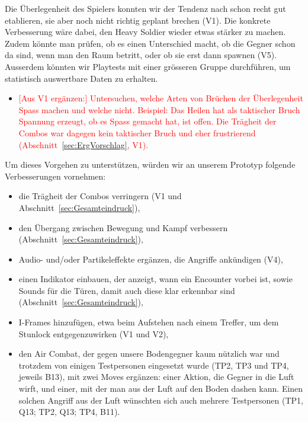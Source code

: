 \documentclass[../Main.tex]{subfiles}
\begin{document}
Die Überlegenheit des Spielers konnten wir der Tendenz nach schon recht gut etablieren, sie aber noch nicht richtig geplant brechen (V1). Die konkrete Verbesserung wäre dabei, den Heavy Soldier wieder etwas stärker zu machen. Zudem könnte man prüfen, ob es einen Unterschied macht, ob die Gegner schon da sind, wenn man den Raum betritt, oder ob sie erst dann spawnen (V5). Ausserdem könnten wir Playtests mit einer grösseren Gruppe durchführen, um statistisch auswertbare Daten zu erhalten.

\begin{itemize}[leftmargin=1.5cm]
    \item \textcolor{red}{[Aus V1 ergänzen:] Untersuchen, welche Arten von Brüchen der Überlegenheit Spass machen und welche nicht. Beispiel: Das Heilen hat als taktischer Bruch Spannung erzeugt, ob es Spass gemacht hat, ist offen. Die Trägheit der Combos war dagegen kein taktischer Bruch und eher frustrierend (Abschnitt~\ref{sec:ErgVorschlag}, V1).}
\end{itemize}

Um dieses Vorgehen zu unterstützen, würden wir an unserem Prototyp folgende Verbesserungen vornehmen:

\begin{itemize}[leftmargin=1.5cm]
    \item die Trägheit der Combos verringern (V1 und Abschnitt~\ref{sec:Gesamteindruck}),
    \item den Übergang zwischen Bewegung und Kampf verbessern (Abschnitt~\ref{sec:Gesamteindruck}),
    \item Audio- und/oder Partikeleffekte ergänzen, die Angriffe ankündigen (V4),
    \item einen Indikator einbauen, der anzeigt, wann ein Encounter vorbei ist, sowie Sounds für die Türen, damit auch diese klar erkennbar sind (Abschnitt~\ref{sec:Gesamteindruck}),
    \item I-Frames hinzufügen, etwa beim Aufstehen nach einem Treffer, um dem Stunlock entgegenzuwirken (V1 und V2),
    \item den Air Combat, der gegen unsere Bodengegner kaum nützlich war und trotzdem von einigen Testpersonen eingesetzt wurde (TP2, TP3 und TP4, jeweils B13), mit zwei Moves ergänzen: einer Aktion, die Gegner in die Luft wirft, und einer, mit der man aus der Luft auf den Boden dashen kann. Einen solchen Angriff aus der Luft wünschten sich auch mehrere Testpersonen (TP1, Q13; TP2, Q13; TP4, B11).
\end{itemize}
\end{document}
